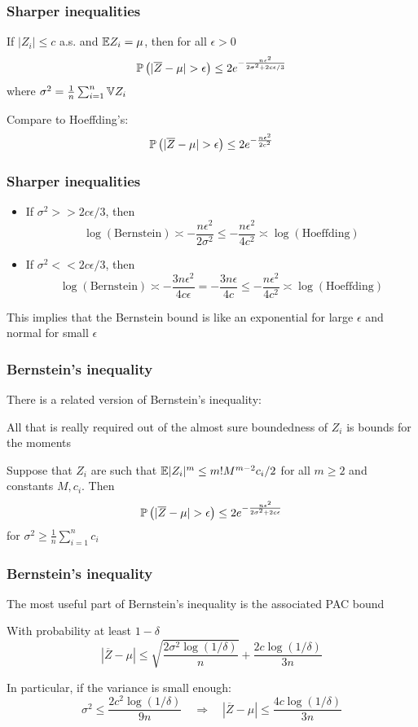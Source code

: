 \documentclass[12pt]{beamer}
\begin{document}
\begin{frame}[fragile]
\frametitle{Sharper inequalities}
If $|Z_i| \leq c$ a.s. and $\E Z_i = \mu$, then for all $\epsilon > 0$
\[
\P\left( |\overline{Z} - \mu| > \epsilon\right) \leq 2e^{-\frac{n\epsilon^2}{2\sigma^2 + 2c\epsilon/3}}
\]
where $\sigma^2 = \frac{1}{n} \sum_{i=1}^n\V Z_i$
\vsp

Compare to Hoeffding's:
\[
\P\left( |\overline{Z} - \mu| > \epsilon\right) \leq 2e^{-\frac{n\epsilon^2}{2c^2}}
\]
\end{frame}


\begin{frame}[fragile]
\frametitle{Sharper inequalities}
\begin{itemize}
\item If $\sigma^2 >> 2c\epsilon/3$, then 
\[
\log(\textrm{Bernstein}) \asymp -\frac{n\epsilon^2}{2\sigma^2} \leq -\frac{n\epsilon^2}{4c^2}  \asymp \log(\textrm{Hoeffding})
\]
\item If $\sigma^2 << 2c\epsilon/3$, then 
\[
\log(\textrm{Bernstein}) \asymp -\frac{3n\epsilon^2}{4c\epsilon} =  -\frac{3n\epsilon}{4c} \leq -\frac{n\epsilon^2}{4c^2}  \asymp \log(\textrm{Hoeffding})
\]
\end{itemize}

  This implies that the Bernstein bound is like an exponential for large $\epsilon$
and normal for small $\epsilon$
\end{frame}

\begin{frame}[fragile]
\frametitle{Bernstein's inequality}
There is a related  version of Bernstein's inequality:

\vsp
All that is really required out of the almost sure boundedness of $Z_i$ is bounds for the moments

\vsp
Suppose that $Z_i$ are such that $\E|Z_i|^m \leq m!M^{m-2}c_i/2$ for all $m \geq 2$ and constants $M, c_i$.  Then
\[
\P\left( |\overline{Z} - \mu| > \epsilon\right) \leq 2e^{-\frac{n\epsilon^2}{2\sigma^2 + 2c\epsilon}}
\]
for $\sigma^2 \geq \frac{1}{n} \sum_{i=1}^n c_i$
\end{frame}

\begin{frame}[fragile]
\frametitle{Bernstein's inequality}
The most useful part of Bernstein's inequality is the associated PAC bound

\vsp
With probability at least $1-\delta$ 
\[
|\overline{Z} - \mu| \leq \sqrt{\frac{2\sigma^2\log(1/\delta)}{n}} + \frac{2c\log(1/\delta)}{3n}
\]

\vsp
In particular, if the variance is small enough:
\[
\sigma^2 \leq \frac{2c^2\log(1/\delta)}{9n}
\quad \Rightarrow \quad |\overline{Z} - \mu| \leq \frac{4c\log(1/\delta)}{3n}
\]
\end{frame}
\end{document}
